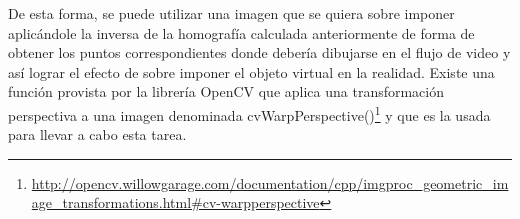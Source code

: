 \documentclass[a4paper,11pt,spanish]{article}
\begin{document}
De esta forma, se puede utilizar una imagen que se quiera sobre imponer aplicándole la inversa de la homografía calculada anteriormente de forma de obtener los puntos correspondientes donde debería dibujarse en el flujo de video y así lograr el efecto de sobre imponer el objeto virtual en la realidad. Existe una función provista por la librería OpenCV que aplica una transformación perspectiva a una imagen denominada cvWarpPerspective()\footnote{\url{http://opencv.willowgarage.com/documentation/cpp/imgproc_geometric_image_transformations.html#cv-warpperspective}} y que es la usada para llevar a cabo esta tarea.

\newpage


\end{document}
